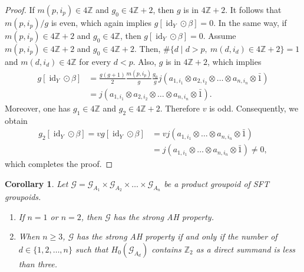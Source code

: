 \documentclass[11pt]{article}
\newtheorem{corollary}[theorem]{Corollary}
\theoremstyle{definition}
\numberwithin{equation}{section}
\newcommand{\id}{\operatorname{id}}
\newcommand{\G}{\mathcal{G}}
\newcommand{\Z}{\mathbb{Z}}
\begin{document}
\begin{proof}
If $m(p,i_p)\in4\Z$ and $g_0\in4\Z+2$, then $g$ is in $4\Z+2$. 
It follows that $m(p,i_p)/g$ is even, 
which again implies $g[\id_Y\odot\beta]=0$. 
In the same way, if $m(p,i_p)\in4\Z+2$ and $g_0\in4\Z$, 
then $g[\id_Y\odot\beta]=0$. 
Assume $m(p,i_p)\in4\Z+2$ and $g_0\in4\Z+2$. 
Then, $\#\{d\mid d>p,\ m(d,i_d)\in4\Z{+}2\}=1$ and 
$m(d,i_d)\in4\Z$ for every $d<p$. 
Also, $g$ is in $4\Z+2$, which implies 
\begin{align*}
g[\id_Y\odot\beta]&=\frac{g(g+1)}{2}\frac{m(p,i_p)}{g}\frac{g_0}{g}
j(a_{1,i_1}\otimes a_{2,i_2}\otimes\dots\otimes a_{n,i_n}\otimes\bar{1})\\
&=j(a_{1,i_1}\otimes a_{2,i_2}\otimes\dots\otimes a_{n,i_n}\otimes\bar{1}). 
\end{align*}
Moreover, one has $g_1\in4\Z$ and $g_2\in4\Z+2$. 
Therefore $v$ is odd. 
Consequently, we obtain 
\begin{align*}
g_2[\id_Y\odot\beta]=vg[\id_Y\odot\beta]
&=vj(a_{1,i_1}\otimes\dots\otimes a_{n,i_n}\otimes\bar{1})\\
&=j(a_{1,i_1}\otimes\dots\otimes a_{n,i_n}\otimes\bar{1})\neq0, 
\end{align*}
which completes the proof. 
\end{proof}

\begin{corollary}
Let $\G=\G_{A_1}\times\G_{A_2}\times\dots\times\G_{A_n}$ be 
a product groupoid of SFT groupoids. 
\begin{enumerate}
\item If $n=1$ or $n=2$, then $\G$ has the strong AH property. 
\item When $n\geq3$, $\G$ has the strong AH property if and only if 
the number of $d\in\{1,2,\dots,n\}$ such that $H_0(\G_{A_d})$ contains 
$\Z_2$ as a direct summand is less than three. 
\end{enumerate}
\end{corollary}
\end{document}
